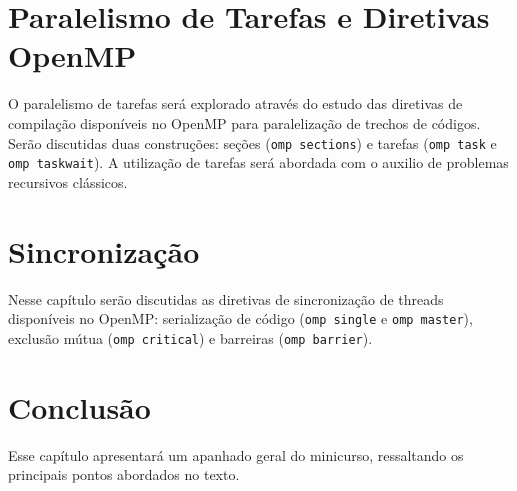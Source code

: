 \documentclass{SBCbookchapter}
\begin{document}
\section{Paralelismo de Tarefas e Diretivas OpenMP}

O paralelismo de tarefas será explorado através do estudo das diretivas de compilação disponíveis no OpenMP para paralelização de trechos de códigos. Serão discutidas duas construções: seções (\texttt{omp sections}) e tarefas (\texttt{omp task} e \texttt{omp taskwait}). A utilização de tarefas será abordada com o auxilio de problemas recursivos clássicos.

\section{Sincronização}

Nesse capítulo serão discutidas as diretivas de sincronização de threads disponíveis no OpenMP: serialização de código (\texttt{omp single} e \texttt{omp master}), exclusão mútua (\texttt{omp critical}) e barreiras (\texttt{omp barrier}).

\section{Conclusão}

Esse capítulo apresentará um apanhado geral do minicurso, ressaltando os principais pontos abordados no texto.
\end{document}
